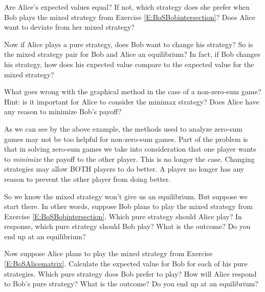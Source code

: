 \begin{xca}\label{E:BoSAlicepref}
Are Alice's expected values equal? If not, which strategy does she prefer when Bob plays the mixed strategy from Exercise \ref{E:BoSBobintersection}? Does Alice want to deviate from her mixed strategy?
\end{xca}

\begin{xca}\label{E:BoSBobchange}
Now if Alice plays a pure strategy, does Bob want to change his strategy? So is the mixed strategy pair for Bob and Alice an equilibrium? In fact, if Bob changes his strategy, how does his expected value compare to the expected value for the mixed strategy?
\end{xca}

\begin{xca}\label{E:BoSgraphwrong}
What goes wrong with the graphical method in the case of a non-zero-sum game? Hint: is it important for Alice to consider the minimax strategy? Does Alice have any reason to minimize Bob's payoff?
\end{xca}

As we can see by the above example, the methods used to analyze zero-sum games may not be too helpful for non-zero-sum games. Part of the problem is that in solving zero-sum games we take into consideration that one player wants to \emph{minimize} the payoff to the other player. This is no longer the case. Changing strategies may allow BOTH players to do better. A player no longer has any reason to prevent the other player from doing better. 

\begin{xca}\label{E:BoSstartBmixed}
So we know the mixed strategy won't give us an equilibrium. But suppose we start there. In other words, suppose Bob plans to play the mixed strategy from Exercise \ref{E:BoSBobintersection}. Which pure strategy should Alice play? In response, which pure strategy should Bob play? What is the outcome? Do you end up at an equilibrium?
\end{xca}

\begin{xca}\label{E:BoSstartAmixed} Now suppose Alice plans to play the mixed strategy from Exercise \ref{E:BoSAlicematrix}. Calculate the expected value for Bob for each of his pure strategies. Which pure strategy does Bob prefer to play? How will Alice respond to Bob's pure strategy? What is the outcome? Do you end up at an equilibrium?
\end{xca}


